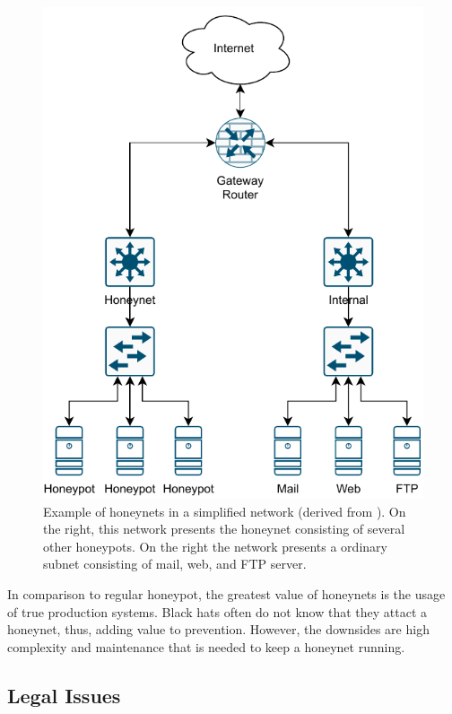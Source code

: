 \begin{figure}[h]
    \centering
    \includegraphics{figures/honeynet-example.pdf}
    \caption[Example of honeynets in a simplified network (derived from \cite{Spitzner2003})]{Example of honeynets in a simplified network (derived from \cite{Spitzner2003}). On the right, this network presents the honeynet consisting of several other honeypots. On the right the network presents a ordinary subnet consisting of mail, web, and FTP server.}
    \label{fig:honeynet-example}
\end{figure}

In comparison to regular honeypot, the greatest value of honeynets is the usage of true production systems.
Black hats often do not know that they attact a honeynet, thus, adding value to prevention.
However, the downsides are high complexity and maintenance that is needed to keep a honeynet running. \cite{Spitzner2003}

\subsection{Legal Issues}

